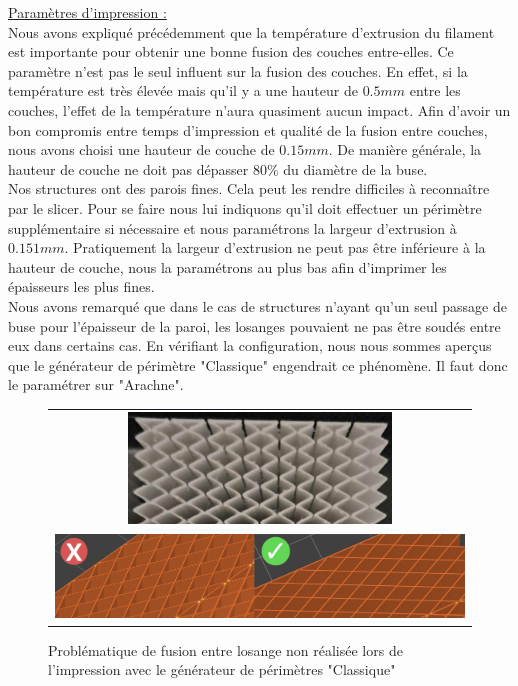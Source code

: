 \documentclass[a4paper]{article}
\begin{document}
	\underline{Paramètres d'impression :}\\
	
	\hspace{0.5cm}Nous avons expliqué précédemment que la température d'extrusion du filament est importante pour obtenir une bonne fusion des couches entre-elles. Ce paramètre n'est pas le seul influent sur la fusion des couches. En effet, si la température est très élevée mais qu'il y a une hauteur de $0.5 mm$ entre les couches, l'effet de la température n'aura quasiment aucun impact. Afin d'avoir un bon compromis entre temps d'impression et qualité de la fusion entre couches, nous avons choisi une hauteur de couche de $0.15 mm$. De manière générale, la hauteur de couche ne doit pas dépasser $80 \%$ du diamètre de la buse.\\
	
	Nos structures ont des parois fines. Cela peut les rendre difficiles à reconnaître par le slicer. Pour se faire nous lui indiquons qu'il doit effectuer un périmètre supplémentaire si nécessaire et nous paramétrons la largeur d'extrusion à $0.151 mm$. Pratiquement la largeur d'extrusion ne peut pas être inférieure à la hauteur de couche, nous la paramétrons au plus bas afin d'imprimer les épaisseurs les plus fines.\\
	
	Nous avons remarqué que dans le cas de structures n'ayant qu'un seul passage de buse pour l'épaisseur de la paroi, les losanges pouvaient ne pas être soudés entre eux dans certains cas. En vérifiant la configuration, nous nous sommes aperçus que le générateur de périmètre "Classique" engendrait ce phénomène. Il faut donc le paramétrer sur "Arachne".
	
	\begin{figure}[H]
		\centering
		\begin{tabular}{c}
			\includegraphics[width=7cm]{Images/4/jointure_murs.jpg}\\
			\includegraphics[width=16cm]{Images/4/ok_nok_perimetres.png}\\
		\end{tabular}
		\caption{Problématique de fusion entre losange non réalisée lors de l'impression avec le générateur de périmètres "Classique"}
	\end{figure}
\end{document}
